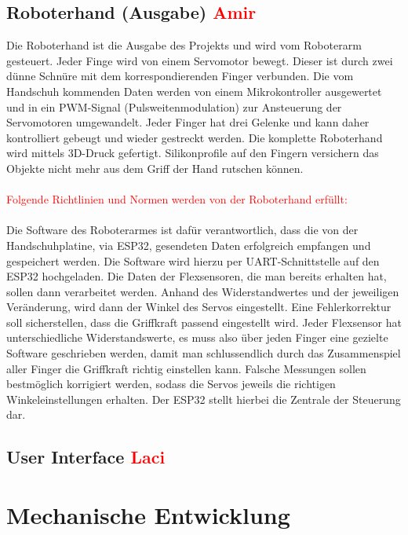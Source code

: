 \documentclass[11pt]{article}
\begin{document}
\subsection{Roboterhand (Ausgabe) \textcolor{red}{Amir}}
Die Roboterhand ist die Ausgabe des Projekts und wird vom Roboterarm gesteuert. Jeder Finge wird von einem Servomotor 
bewegt. Dieser ist durch zwei dünne Schnüre mit dem korrespondierenden Finger verbunden. Die vom Handschuh kommenden 
Daten werden von einem Mikrokontroller ausgewertet und in ein PWM-Signal (Pulsweitenmodulation) zur Ansteuerung der 
Servomotoren umgewandelt. Jeder Finger hat drei Gelenke und kann daher kontrolliert gebeugt und wieder gestreckt werden. 
Die komplette Roboterhand wird mittels 3D-Druck gefertigt. Silikonprofile auf den Fingern versichern das Objekte nicht 
mehr aus dem Griff der Hand rutschen können.\\
\\
\textcolor{red}{Folgende Richtlinien und Normen werden von der Roboterhand erfüllt:}\\
\\
Die Software des Roboterarmes ist dafür verantwortlich, dass die von der Handschuhplatine, via ESP32, gesendeten Daten 
erfolgreich empfangen und gespeichert werden. Die Software wird hierzu per UART-Schnittstelle auf den ESP32 hochgeladen. 
Die Daten der Flexsensoren, die man bereits erhalten hat, sollen dann verarbeitet werden. Anhand des Widerstandwertes und 
der jeweiligen Veränderung, wird dann der Winkel des Servos eingestellt. Eine Fehlerkorrektur soll sicherstellen, dass die 
Griffkraft passend eingestellt wird. Jeder Flexsensor hat unterschiedliche Widerstandswerte, es muss also über jeden Finger 
eine gezielte Software geschrieben werden, damit man schlussendlich durch das Zusammenspiel aller Finger die Griffkraft 
richtig einstellen kann. Falsche Messungen sollen bestmöglich korrigiert werden, sodass die Servos jeweils die richtigen 
Winkeleinstellungen erhalten. Der ESP32 stellt hierbei die Zentrale der Steuerung dar.

\subsection{User Interface \textcolor{red}{Laci}}


\section{Mechanische Entwicklung}
\end{document}
